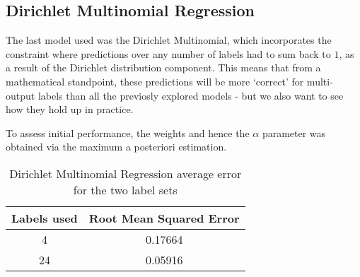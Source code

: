 \subsection{Dirichlet Multinomial Regression}

The last model used was the Dirichlet Multinomial, which incorporates the constraint where predictions over any number of labels had to sum back to $1$, as a result of the Dirichlet distribution component. This means that from a mathematical standpoint, these predictions will be more `correct' for multi-output labels than all the previosly explored models - but we also want to see how they hold up in practice.

To assess initial performance, the weights and hence the $\alpha$ parameter was obtained via the maximum a posteriori estimation.



\begin{table}
    \centering
    \begin{tabular}{|c|c|}
        \hline
        Labels used & Root Mean Squared Error \\\hline
        4 & 0.17664\\
        24  & 0.05916\\
        \hline
    \end{tabular}
    \label{table:dmbasicresults}
    \caption{Dirichlet Multinomial Regression average error for the two label sets}
\end{table}

